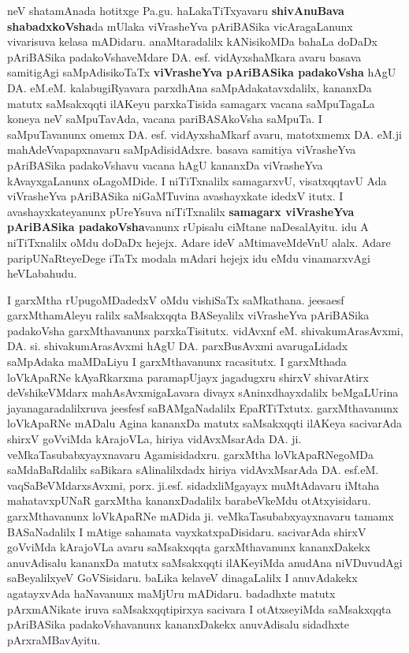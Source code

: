 neV shatamAnada hotitxge Pa.gu. haLakaTiTxyavaru \textbf{shivAnuBava shabadxkoVsha}da mUlaka viVrasheYva pAriBASika vicAragaLanunx vivarisuva kelasa mADidaru. anaMtaradalilx kANisikoMDa bahaLa doDaDx pAriBASika padakoVshaveMdare DA. esf. vidAyxshaMkara avaru basava samitigAgi saMpAdisikoTaTx \textbf{viVrasheYva pAriBASika padakoVsha} hAgU DA. eM.eM. kalabugiRyavara parxdhAna saMpAda\-katavxdalilx, kananxDa matutx saMsakxqqti ilAKeyu parxkaTisida samagarx vacana saMpuTagaLa koneya neV saMpuTavAda, vacana pari\-BASAkoVsha saMpuTa. I saMpuTavanunx omemx DA. esf. vidAyxshaMkarf avaru, matotxmemx DA. eM.ji mahAdeVvapapxnavaru saMpAdisidAdxre. basava samitiya viVrasheYva pAriBASika padakoVshavu vacana hAgU kananxDa viVrasheYva kAvayxgaLanunx oLagoMDide. I niTiTxnalilx samagarxvU, visatxqqtavU Ada viVrasheYva pAriBASika niGaMTuvina avashayxkate idedxV itutx. I avashayxkateyanunx pUreYsuva niTiTxnalilx \textbf{samagarx viVrasheYva pAriBASika padakoVsha}vanunx rUpisalu ciMtane naDesalAyitu. idu A niTiTxnalilx oMdu doDaDx hejejx. Adare ideV aMtimaveMdeVnU alalx. Adare paripUNaRteyeDege iTaTx modala mAdari hejejx idu eMdu vinamarxvAgi heVLabahudu.

I garxMtha rUpugoMDadedxV oMdu vishiSaTx saMkathana. jeesaesf garxMthamAleyu  ralilx saMsakxqqta BASeyalilx viVrasheYva pAriBASika padakoVsha garxMthavanunx parxkaTisitutx. vidAvxnf eM. shivakumArasAvxmi, DA. si. shivakumArasAvxmi hAgU DA. parxBusAvxmi avarugaLidadx saMpAdaka maMDaLiyu I garxMthavanunx racasitutx. I garxMthada loVkApaRNe kAyaRkarxma paramapUjayx jagadugxru shirxV shivarAtirx deVshikeVMdarx mahAsAvxmigaLavara divayx sAninxdhayxdalilx beMgaLUrina jayanagaradalilxruva jeesfesf saBAMgaNadalilx EpaR\-TiTxtutx. garxMthavanunx loVkApaRNe mADalu Agina kananxDa matutx saMsakxqqti ilAKeya sacivarAda shirxV goVviMda kArajoVLa, hiriya vidAvxMsarAda DA. ji. veMkaTasubabxyayxnavaru Agamisidadxru. garxMtha loVkApaRNegoMDa saMdaBaRdalilx saBikara sAlinalilxdadx hiriya vidAvxMsarAda DA. esf.eM. vaqSaBeVMdarxsAvxmi, porx. ji.esf. sidadxliMgayayx muMtAdavaru iMtaha mahatavxpUNaR garxMtha kananxDadalilx barabeVkeMdu otAtxyisidaru. garxMthavanunx loVkApaRNe mADida ji. veMkaTasubabxyayxnavaru tamamx BASaNadalilx I mAtige sahamata vayxkatxpaDisidaru. sacivarAda shirxV goVviMda kArajoVLa avaru saMsakxqqta garxMthavanunx kananxDakekx anuvAdisalu kananxDa matutx saMsakxqqti ilAKeyiMda anudAna niVDuvudAgi saBeyalilxyeV GoVSisidaru. baLika kelaveV dinagaLalilx I anuvAdakekx agatayxvAda haNavanunx maMjUru mADidaru. badadhxte matutx pArxmANikate iruva saMsakxqqtipirxya sacivara I otAtxseyiMda saMsakxqqta pAriBASika padakoVshavanunx kananxDakekx anuvAdisalu sidadhxte pArxraMBavAyitu.

